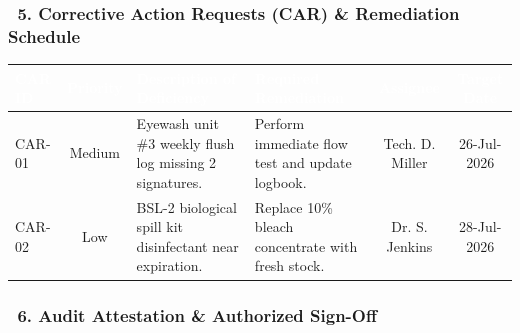\documentclass[10pt,a4paper]{scrartcl}
\begin{document}
\vspace{6pt}

\subsubsection*{\textcolor{NavyPrimary}{\faClipboardList\ 5. Corrective Action Requests (CAR) \& Remediation Schedule}}

\begin{tcolorbox}[auditcard, left=0pt, right=0pt, top=0pt, bottom=0pt]
\small
{}
\begin{tabularx}{\textwidth}{l c X X c c}
\rowcolor{TableHeadBg}
\textcolor{white}{\textbf{CAR ID}} & \textcolor{white}{\textbf{Priority}} & \textcolor{white}{\textbf{Description of Deficiency}} & \textcolor{white}{\textbf{Required Remediation}} & \textcolor{white}{\textbf{Assignee}} & \textcolor{white}{\textbf{Target Date}} \\
\midrule
CAR-01 & Medium & Eyewash unit \#3 weekly flush log missing 2 signatures. & Perform immediate flow test and update logbook. & Tech. D. Miller & 26-Jul-2026 \\
CAR-02 & Low & BSL-2 biological spill kit disinfectant near expiration. & Replace 10\% bleach concentrate with fresh stock. & Dr. S. Jenkins & 28-Jul-2026 \\
\bottomrule
\end{tabularx}
\end{tcolorbox}

\vspace{6pt}

\subsubsection*{\textcolor{NavyPrimary}{\faFileContract\ 6. Audit Attestation \& Authorized Sign-Off}}
\end{document}
